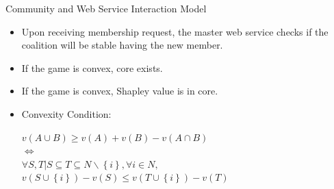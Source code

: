 \documentclass{beamer}
\begin{document}
\begin{frame}{Community and Web Service Interaction Model}
    \begin{itemize}
        \item Upon receiving membership request, the master web service checks if the coalition will be stable having the new member.
        \item If the game is convex, core exists.
        \item If the game is convex, Shapley value is in core.
        \item Convexity Condition:
        \begin{center}
          $v(A \cup B) \geq v(A) + v(B) - v(A \cap B)$ \\
          $\Leftrightarrow$  \\
          $\forall S,T | S \subseteq T \subseteq N \backslash \left\{i\right\}, \forall i \in N,$ \\
          {\color{blue} $v(S \cup \left\{i\right\}) - v(S) \leq v (T \cup \left\{i\right\}) - v(T)$ }
        \end{center}
    \end{itemize}       	
\end{frame}
\end{document}
